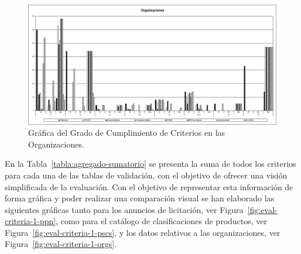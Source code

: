 \begin{figure}[!htb]
\centering
	\includegraphics[width=16cm]{./images/phd/experimentation/criterios-orgs}
\caption{Gráfica del Grado de Cumplimiento de Criterios en las Organizaciones.}
\label{fig:eval-criteria-orgs}
\end{figure}

\clearpage

En la Tabla~\ref{tabla:agregado-sumatorio} se presenta la suma de todos los criterios para cada una de las tablas de validación, con el 
objetivo de ofrecer una visión simplificada de la evaluación. Con el objetivo de representar esta información de forma 
gráfica y poder realizar una comparación visual se han elaborado las siguientes gráficas tanto para los 
anuncios de licitación, ver Figura~\ref{fig:eval-criteria-1-ppn}, como para el catálogo de clasificaciones de productos, 
ver Figura~\ref{fig:eval-criteria-1-pscs}, y los datos relativos a las organizaciones, ver Figura~\ref{fig:eval-criteria-1-orgs}.


